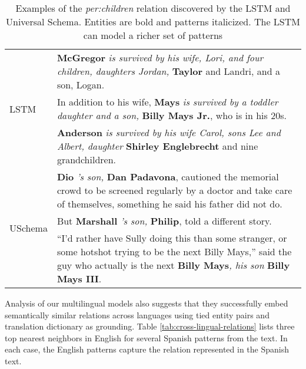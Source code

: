 \begin{table}[h]
\vspace{-.15cm}
\begin{center}
\caption{Examples of the \emph{per:children} relation discovered by the LSTM and Universal Schema. Entities are bold and patterns italicized. The LSTM can model a richer set of patterns \label{tab:lstm-us-similar-rels}}
\small
\begin{tabular}{|p{}|p{}|}
\hline
\multirow{3}{*}{LSTM} 
& {\bf McGregor} \emph{is survived by his wife, Lori, and four children, daughters Jordan,} { \bf Taylor} and Landri, and a son, Logan. \\ \cline{2-2} 
& In addition to his wife, {\bf Mays} \emph{is survived by a toddler daughter and a son,} {\bf Billy Mays Jr.}, who is in his 20s. \\ \cline{2-2} 
& {\bf Anderson} \emph{is survived by his wife Carol, sons Lee and Albert, daughter} {\bf Shirley Englebrecht} and nine grandchildren. \\ 
\hline\hline
\multirow{3}{*}{USchema} 
& {\bf Dio} \emph{'s son,} {\bf Dan Padavona}, cautioned the memorial crowd to be screened regularly by a doctor and take care of themselves, something he said his father did not do. \\ \cline{2-2} 
& But {\bf Marshall} \emph{'s son,} {\bf Philip}, told a different story.  \\ \cline{2-2} 
& ``I'd rather have Sully doing this than some stranger, or some hotshot trying to 
be the next Billy Mays,'' said the guy who actually is the next {\bf Billy Mays}\emph{, his son} {\bf Billy Mays III}. \\ 
\hline
\end{tabular}
\end{center}
\end{table}

Analysis of our multilingual models also suggests that they successfully embed semantically similar relations across languages using tied entity pairs and translation dictionary as grounding. Table \ref{tab:cross-lingual-relations} lists three top nearest neighbors in English for several Spanish patterns from the text. In each case, the English patterns capture the relation represented in the Spanish text. 

